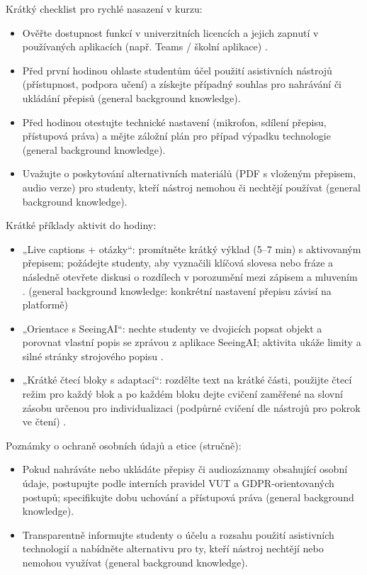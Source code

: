 Krátký checklist pro rychlé nasazení v kurzu:
\begin{itemize}
  \item Ověřte dostupnost funkcí v univerzitních licencích a jejich zapnutí v používaných aplikacích (např. Teams / školní aplikace) \cite{kb_ai_101_tipu_pdf_04e4a115_page_7_1}. 
  \item Před první hodinou ohlaste studentům účel použití asistivních nástrojů (přístupnost, podpora učení) a získejte případný souhlas pro nahrávání či ukládání přepisů (general background knowledge).
  \item Před hodinou otestujte technické nastavení (mikrofon, sdílení přepisu, přístupová práva) a mějte záložní plán pro případ výpadku technologie (general background knowledge).
  \item Uvažujte o poskytování alternativních materiálů (PDF s vloženým přepisem, audio verze) pro studenty, kteří nástroj nemohou či nechtějí používat (general background knowledge).
\end{itemize}

Krátké příklady aktivit do hodiny:
\begin{itemize}
  \item „Live captions + otázky“: promítněte krátký výklad (5–7 min) s aktivovaným přepisem; požádejte studenty, aby vyznačili klíčová slovesa nebo fráze a následně otevřete diskusi o rozdílech v porozumění mezi zápisem a mluvením \cite{kb_ai_101_tipu_pdf_04e4a115_page_11_1}. (general background knowledge: konkrétní nastavení přepisu závisí na platformě)
  \item „Orientace s SeeingAI“: nechte studenty ve dvojicích popsat objekt a porovnat vlastní popis se zprávou z aplikace SeeingAI; aktivita ukáže limity a silné stránky strojového popisu \cite{kb_ai_101_tipu_pdf_04e4a115_page_11_1}.
  \item „Krátké čtecí bloky s adaptací“: rozdělte text na krátké části, použijte čtecí režim pro každý blok a po každém bloku dejte cvičení zaměřené na slovní zásobu určenou pro individualizaci (podpůrné cvičení dle nástrojů pro pokrok ve čtení) \cite{kb_ai_101_tipu_pdf_04e4a115_page_7_1}.
\end{itemize}

Poznámky o ochraně osobních údajů a etice (stručně):
\begin{itemize}
  \item Pokud nahráváte nebo ukládáte přepisy či audiozáznamy obsahující osobní údaje, postupujte podle interních pravidel VUT a GDPR‑orientovaných postupů; specifikujte dobu uchování a přístupová práva (general background knowledge).
  \item Transparentně informujte studenty o účelu a rozsahu použití asistivních technologií a nabídněte alternativu pro ty, kteří nástroj nechtějí nebo nemohou využívat (general background knowledge).
\end{itemize}

